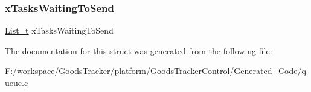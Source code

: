 \subsubsection{\texorpdfstring{x\+Tasks\+Waiting\+To\+Send}{xTasksWaitingToSend}}
{\footnotesize\ttfamily \hyperlink{list_8h_afd590ef6400071b4d63d65ef90bea7f4}{List\+\_\+t} x\+Tasks\+Waiting\+To\+Send}



The documentation for this struct was generated from the following file\+:\begin{DoxyCompactItemize}
\item 
F\+:/workspace/\+Goods\+Tracker/platform/\+Goods\+Tracker\+Control/\+Generated\+\_\+\+Code/\hyperlink{queue_8c}{queue.\+c}\end{DoxyCompactItemize}
